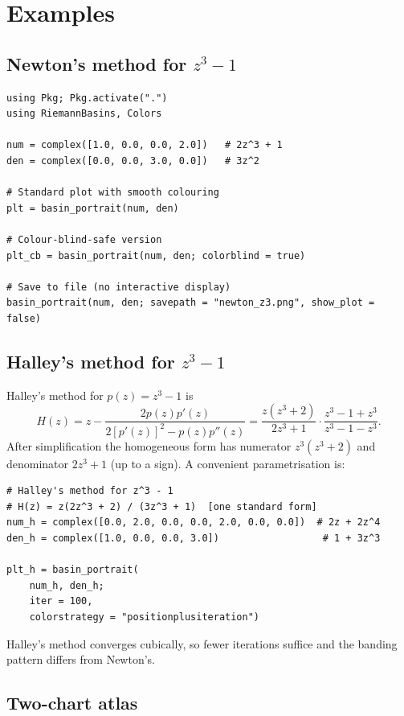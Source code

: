 \documentclass[11pt,a4paper]{article}
\theoremstyle{definition}
\begin{document}
\section{Examples}

\subsection{Newton's method for $z^3 - 1$}

\begin{lstlisting}
using Pkg; Pkg.activate(".")
using RiemannBasins, Colors

num = complex([1.0, 0.0, 0.0, 2.0])   # 2z^3 + 1
den = complex([0.0, 0.0, 3.0, 0.0])   # 3z^2

# Standard plot with smooth colouring
plt = basin_portrait(num, den)

# Colour-blind-safe version
plt_cb = basin_portrait(num, den; colorblind = true)

# Save to file (no interactive display)
basin_portrait(num, den; savepath = "newton_z3.png", show_plot = false)
\end{lstlisting}

\subsection{Halley's method for $z^3 - 1$}

Halley's method for $p(z) = z^3 - 1$ is
\[
  H(z) = z - \frac{2p(z)p'(z)}{2[p'(z)]^2 - p(z)p''(z)}
         = \frac{z(z^3+2)}{2z^3+1} \cdot \frac{z^3-1+z^3}{z^3-1-z^3}.
\]
After simplification the homogeneous form has numerator $z^3(z^3+2)$ and
denominator $2z^3+1$ (up to a sign).
A convenient parametrisation is:

\begin{lstlisting}
# Halley's method for z^3 - 1
# H(z) = z(2z^3 + 2) / (3z^3 + 1)  [one standard form]
num_h = complex([0.0, 2.0, 0.0, 0.0, 2.0, 0.0, 0.0])  # 2z + 2z^4
den_h = complex([1.0, 0.0, 0.0, 3.0])                  # 1 + 3z^3

plt_h = basin_portrait(
    num_h, den_h;
    iter = 100,
    colorstrategy = "positionplusiteration")
\end{lstlisting}

Halley's method converges cubically, so fewer iterations suffice and the
banding pattern differs from Newton's.

\subsection{Two-chart atlas}
\end{document}
